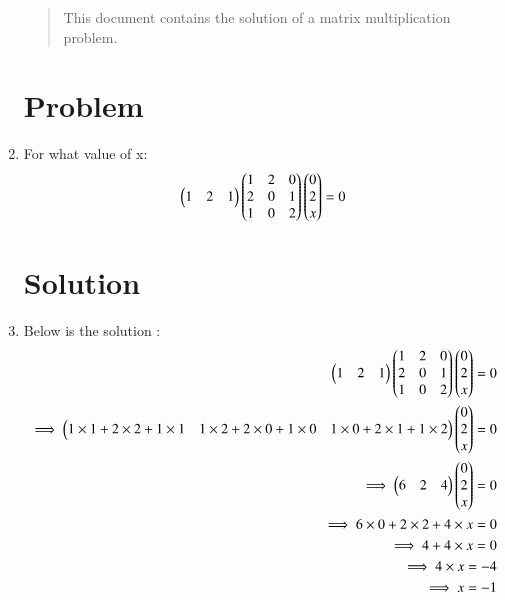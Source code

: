 \begin{enumerate}[label=\thesection.\arabic*.,ref=\thesection.\theenumi]

\begin{abstract}
This document contains the solution of a matrix multiplication problem.
\end{abstract}

\section{Problem}
\item For what value of x:
\begin{align}
    \begin{pmatrix}1 & 2 & 1\end{pmatrix}\begin{pmatrix}1 & 2 & 0 \\2 & 0 & 1\\1 & 0 & 2\end{pmatrix}\begin{pmatrix}0 \\ 2 \\ x\end{pmatrix}=0
\end{align}

\section{Solution}
\item Below is the solution :
\begin{align}
    \begin{pmatrix}1 & 2 & 1\end{pmatrix}\begin{pmatrix}1 & 2 & 0 \\2 & 0 & 1\\1 & 0 & 2\end{pmatrix}\begin{pmatrix}0 \\ 2 \\ x\end{pmatrix}=0
\\
    \implies\begin{pmatrix}1\times1+2\times2+1\times1 & 1\times2+2\times0+1\times0 & 1\times0+2\times1+1\times2\end{pmatrix}\begin{pmatrix}0 \\ 2 \\ x\end{pmatrix}=0
\\
    \implies\begin{pmatrix}6 & 2 & 4\end{pmatrix}\begin{pmatrix}0 \\ 2 \\ x\end{pmatrix}=0
\\
    \implies 6\times0+2\times2+4\times x=0
\\
    \implies 4+4\times x=0
\\
    \implies 4\times x=-4
\\
    \implies x=-1
\end{align}

\end{enumerate}


